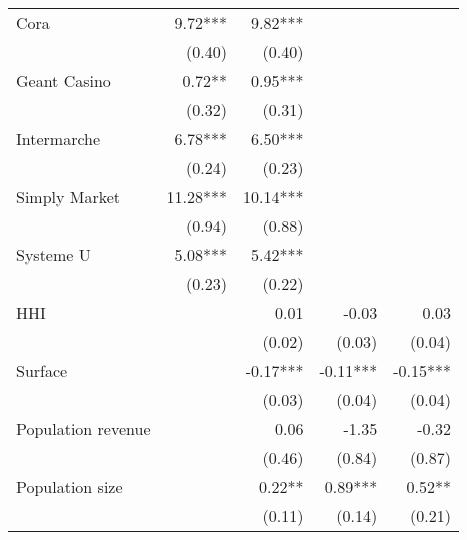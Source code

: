 \documentclass[english]{article}
\begin{document}
\begin{table}[H]
\begin{threeparttable}
\begin{tabular}{lrrrr}
Cora                                                    & 9.72***   & 9.82***  &           &            \\
                                                        & (0.40)    & (0.40)   &           &            \\
Geant Casino                                            & 0.72**    & 0.95***  &           &            \\
                                                        & (0.32)    & (0.31)   &           &            \\
Intermarche                                             & 6.78***   & 6.50***  &           &            \\
                                                        & (0.24)    & (0.23)   &           &            \\
Simply Market                                           & 11.28***  & 10.14*** &           &            \\
                                                        & (0.94)    & (0.88)   &           &            \\
Systeme U                                               & 5.08***   & 5.42***  &           &            \\
                                                        & (0.23)    & (0.22)   &           &            \\
HHI                                                     &           & 0.01     & -0.03     & 0.03       \\
                                                        &           & (0.02)   & (0.03)    & (0.04)     \\
Surface                                                 &           & -0.17*** & -0.11***  & -0.15***   \\
                                                        &           & (0.03)   & (0.04)    & (0.04)     \\
Population revenue                                      &           & 0.06     & -1.35     & -0.32      \\
                                                        &           & (0.46)   & (0.84)    & (0.87)     \\
Population size                                         &           & 0.22**   & 0.89***   & 0.52**     \\
                                                        &           & (0.11)   & (0.14)    & (0.21)     \\

\end{tabular}
\end{threeparttable}
\end{table}
\end{document}
